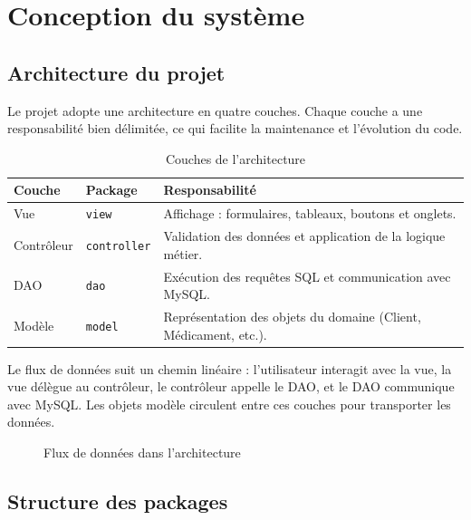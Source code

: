 \documentclass[12pt,a4paper]{report}
\begin{document}
\chapter{Conception du système}

\section{Architecture du projet}

Le projet adopte une architecture en quatre couches. Chaque couche a une responsabilité bien délimitée, ce qui facilite la maintenance et l'évolution du code.

\begin{table}[H]
\centering
\begin{tabularx}{\textwidth}{llX}
\toprule
\textbf{Couche} & \textbf{Package} & \textbf{Responsabilité} \\
\midrule
Vue         & \texttt{view}       & Affichage : formulaires, tableaux, boutons et onglets. \\
Contrôleur  & \texttt{controller} & Validation des données et application de la logique métier. \\
DAO         & \texttt{dao}        & Exécution des requêtes SQL et communication avec MySQL. \\
Modèle      & \texttt{model}      & Représentation des objets du domaine (Client, Médicament, etc.). \\
\bottomrule
\end{tabularx}
\caption{Couches de l'architecture}
\end{table}

Le flux de données suit un chemin linéaire : l'utilisateur interagit avec la vue, la vue délègue au contrôleur, le contrôleur appelle le DAO, et le DAO communique avec MySQL. Les objets modèle circulent entre ces couches pour transporter les données.

\begin{figure}[H]
\centering
{}
\caption{Flux de données dans l'architecture}
\end{figure}

\section{Structure des packages}
\end{document}
